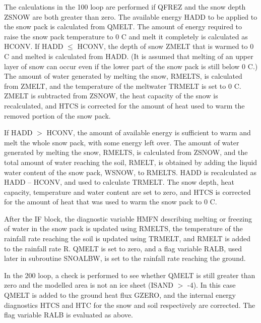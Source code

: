 The calculations in the 100 loop are performed if Q\+F\+R\+E\+Z and the snow depth Z\+S\+N\+O\+W are both greater than zero. The available energy H\+A\+D\+D to be applied to the snow pack is calculated from Q\+M\+E\+L\+T. The amount of energy required to raise the snow pack temperature to 0 C and melt it completely is calculated as H\+C\+O\+N\+V. If H\+A\+D\+D $\leq$ H\+C\+O\+N\+V, the depth of snow Z\+M\+E\+L\+T that is warmed to 0 C and melted is calculated from H\+A\+D\+D. (It is assumed that melting of an upper layer of snow can occur even if the lower part of the snow pack is still below 0 C.) The amount of water generated by melting the snow, R\+M\+E\+L\+T\+S, is calculated from Z\+M\+E\+L\+T, and the temperature of the meltwater T\+R\+M\+E\+L\+T is set to 0 C. Z\+M\+E\+L\+T is subtracted from Z\+S\+N\+O\+W, the heat capacity of the snow is recalculated, and H\+T\+C\+S is corrected for the amount of heat used to warm the removed portion of the snow pack.

If H\+A\+D\+D $>$ H\+C\+O\+N\+V, the amount of available energy is sufficient to warm and melt the whole snow pack, with some energy left over. The amount of water generated by melting the snow, R\+M\+E\+L\+T\+S, is calculated from Z\+S\+N\+O\+W, and the total amount of water reaching the soil, R\+M\+E\+L\+T, is obtained by adding the liquid water content of the snow pack, W\+S\+N\+O\+W, to R\+M\+E\+L\+T\+S. H\+A\+D\+D is recalculated as H\+A\+D\+D – H\+C\+O\+N\+V, and used to calculate T\+R\+M\+E\+L\+T. The snow depth, heat capacity, temperature and water content are set to zero, and H\+T\+C\+S is corrected for the amount of heat that was used to warm the snow pack to 0 C.

After the I\+F block, the diagnostic variable H\+M\+F\+N describing melting or freezing of water in the snow pack is updated using R\+M\+E\+L\+T\+S, the temperature of the rainfall rate reaching the soil is updated using T\+R\+M\+E\+L\+T, and R\+M\+E\+L\+T is added to the rainfall rate R. Q\+M\+E\+L\+T is set to zero, and a flag variable R\+A\+L\+B, used later in subroutine S\+N\+O\+A\+L\+B\+W, is set to the rainfall rate reaching the ground.

In the 200 loop, a check is performed to see whether Q\+M\+E\+L\+T is still greater than zero and the modelled area is not an ice sheet (I\+S\+A\+N\+D $>$ -\/4). In this case Q\+M\+E\+L\+T is added to the ground heat flux G\+Z\+E\+R\+O, and the internal energy diagnostics H\+T\+C\+S and H\+T\+C for the snow and soil respectively are corrected. The flag variable R\+A\+L\+B is evaluated as above.